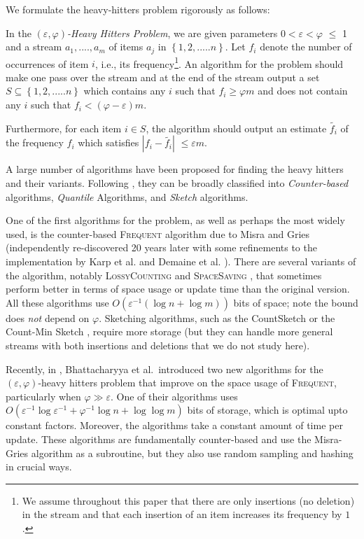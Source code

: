 \documentclass[sigconf,review=true,anonymous=true,screen]{acmart}
\newcommand{\eps}{\varepsilon}
\renewcommand{\phi}{\varphi}
\begin{document}
We formulate the heavy-hitters problem rigorously as follows:
\begin{definition}\label{def:hh}
    In the {\em $(\varepsilon, \varphi)$-Heavy Hitters Problem}, we are given
    parameters $0< \varepsilon <\varphi$ $\leqslant$ 1 and a stream $a_{1},....,a_{m}$
    of items $a_{j}$ in $\left\{1,2,.....n\right\}$. Let $f_{i}$ denote the number of
    occurrences of item $i$, i.e., its frequency\footnote{We assume throughout this paper that there are only insertions (no deletion) in the stream and that each insertion of an item increases its frequency by $1$. }. An algorithm for the problem should make one pass over the stream and at the end
    of the stream output a set $S \subseteq \left\{1,2,.....n\right\}$ which contains any $i$ such that $f_i \geq \phi m$ and does not contain any $i$ such that $f_i < (\phi - \eps)m$.
 
 Furthermore, for each item $i\in S$, the algorithm should output an estimate $\tilde{f_{i}}$ of the frequency $f_{i}$ which satisfies $|f_{i} -\tilde{f_{i}}|$ $ \leqslant \varepsilon m$. 
\end{definition}
    A large number of algorithms have been proposed for finding the heavy hitters and their variants. Following \cite{FrequentSurvey}, they can be broadly classified into {\em Counter-based} algorithms, {\em Quantile} Algorithms,  and {\em Sketch} algorithms. 

    One of the first algorithms for the problem, as well as perhaps the most widely used, is the counter-based \textsc{Frequent} algorithm  due to Misra and Gries \cite{MG82} (independently re-discovered 20 years later with some refinements to the implementation by Karp et al. \cite{KSP03} and Demaine et al. \cite{DLM02}). There are several variants of the algorithm, notably \textsc{LossyCounting} \cite{MM02} and \textsc{SpaceSaving} \cite{MAA05}, that sometimes perform better in terms of space usage or update time than the original version. All these algorithms use $O(\eps^{-1}(\log n + \log m))$ bits of space; note the bound does {\em not} depend on $\varphi$. Sketching algorithms, such as the CountSketch \cite{CCF02} or the Count-Min Sketch \cite{CM05}, require more storage (but they can handle more general streams with both insertions and deletions that we do not study here).
    
Recently, in \cite{BDW16}, Bhattacharyya et al.~introduced two new algorithms for the $(\eps, \phi)$-heavy hitters problem that improve on the space usage of \textsc{Frequent}, particularly when $\phi \gg \eps$. One of their algorithms uses $O(\eps^{-1}\log\eps^{-1}+\phi^{-1} \log n + \log \log m)$ bits of storage, which is optimal upto constant factors. Moreover, the algorithms take a constant amount of time per update. These algorithms are fundamentally counter-based and use the Misra-Gries algorithm as a subroutine, but they also use random sampling and hashing in crucial ways.
\end{document}
